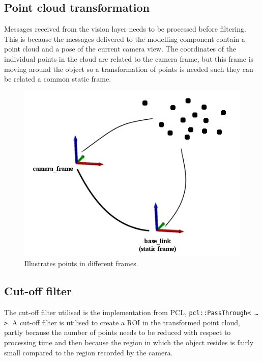 \subsection{Point cloud transformation}
Messages received from the vision layer needs to be processed before filtering. This is because the messages delivered to the modelling component contain a point cloud and a pose of the current camera view. The coordinates of the individual points in the cloud are related to the camera frame, but this frame is moving around the object so a transformation of points is needed such they can be related a common static frame.

\begin{figure}[htb]
	\begin{center}
		\includegraphics[scale=0.7,trim=0 0 0 0]{graphics/07_modelling/pctransform.png}%
		\caption{Illustrates points in different frames.}
		\label{fig:filtering_transform}
	\end{center}
\end{figure}

\subsection{Cut-off filter}
The cut-off filter utilised is the implementation from PCL, \texttt{pcl::PassThrough< \ldots >}. A cut-off filter is utilised to create a ROI in the transformed point cloud, partly because the number of points needs to be reduced with respect to processing time and then because the region in which the object resides is fairly small compared to the region recorded by the camera.

